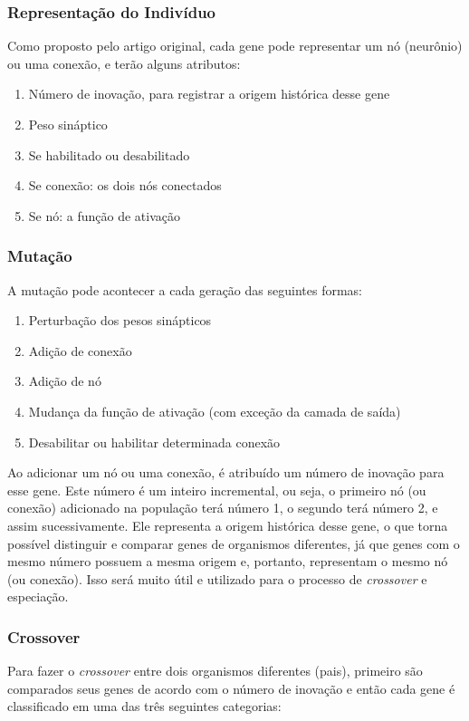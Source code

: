 \documentclass[12pt]{article}
\begin{document}
\subsubsection{Representação do Indivíduo}
Como proposto pelo artigo original, cada gene pode representar um nó (neurônio) ou uma conexão, e terão alguns atributos:
\begin{enumerate}
    \item Número de inovação, para registrar a origem histórica desse gene
    \item Peso sináptico
    \item Se habilitado ou desabilitado
    \item Se conexão: os dois nós conectados
    \item Se nó: a função de ativação
\end{enumerate}

\subsubsection{Mutação}
A mutação pode acontecer a cada geração das seguintes formas:
\begin{enumerate}
    \item Perturbação dos pesos sinápticos
    \item Adição de conexão
    \item Adição de nó
    \item Mudança da função de ativação (com exceção da camada de saída)
    \item Desabilitar ou habilitar determinada conexão
\end{enumerate}

Ao adicionar um nó ou uma conexão, é atribuído um número de inovação para esse gene. Este número é um inteiro incremental, ou seja, o primeiro nó (ou conexão) adicionado na população terá número \num{1}, o segundo terá número \num{2}, e assim sucessivamente. Ele representa a origem histórica desse gene, o que torna possível distinguir e comparar genes de organismos diferentes, já que genes com o mesmo número possuem a mesma origem e, portanto, representam o mesmo nó (ou conexão). Isso será muito útil e utilizado para o processo de \textit{crossover} e especiação. 

\subsubsection{Crossover}
Para fazer o \textit{crossover} entre dois organismos diferentes (pais), primeiro são comparados seus genes de acordo com o número de inovação e então cada gene é classificado em uma das três seguintes categorias:
\end{document}
